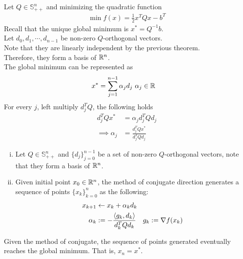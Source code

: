 \documentclass{article}
\begin{document}
	\begin{example}
		Let $Q \in \mathbb{S}_{++}^n$ and minimizing the quadratic function
		\begin{align}
			\min f(x) = \frac{1}{2} x^T Q x - b^T 
		\end{align}
		Recall that the unique global minimum is $x^* = Q^{-1} b$. \\
		Let $d_0, d_1, \cdots, d_{n-1}$ be non-zero $Q$-orthogonal vectors. \\
		Note that they are linearly independent by the previous theorem. \\
		Therefore, they form a basis of $\mathbb{R}^n$. \\
		The global minimum can be represented as 
		\begin{align}
			x^* &= \sum_{j=1}^{n-1} \alpha_j d_j\ \alpha_j \in \mathbb{R}
		\end{align}
		For every $j$, left multiply $d_j^T Q$, the following holds
		\begin{align}
			d_j^T Q x^* &= \alpha_j d_j^T Q d_j \\
			\implies \alpha_j &= \frac{d_j^T Q x^*}{d_j^T Q d_j}
		\end{align}
	\end{example}
	
	\begin{algorithm} \quad
		\begin{enumerate}[(i)]
			\item Let $Q \in \mathbb{S}_{++}^n$ and $\{d_j\}_{j=0}^{n-1}$ be a set of non-zero $Q$-orthogonal vectors, note that they form a basis of $\mathbb{R}^n$. \\
			\item Given initial point $x_0 \in \mathbb{R}^n$, the method of conjugate direction generates a sequence of points $\{x_k\}_{k=0}^n$ as the following:
			\begin{align}
				x_{k+1} &\leftarrow x_k + \alpha_k d_k \\
				\alpha_k &:= - \frac{\langle {g_k}, {d_k} \rangle}{d_k^T Q d_k} \quad g_k := \nabla f(x_k)
			\end{align}
		\end{enumerate}
	\end{algorithm}
	
	\begin{theorem}
		Given the method of conjugate, the sequence of points generated eventually reaches the global minimum. That is, $x_n = x^*$.
	\end{theorem}
	
\end{document}
